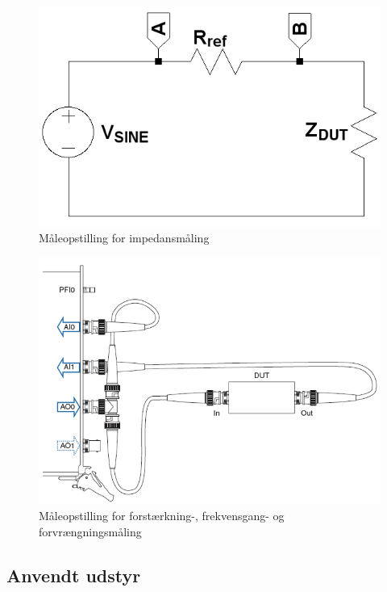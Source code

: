 \begin{figure}[h]
\centering
\includegraphics[scale=0.25]{maalerapporter/forforstaerker/impedansopstilling-forforstaerker.png}
\caption{Måleopstilling for impedansmåling}
\label{fig:maaleop-imp}
\end{figure}

\begin{figure}[h]
\centering
\includegraphics[scale=0.3]{maalerapporter/forforstaerker/maaleopstilling-thd-forforstaerker.png}
\caption{Måleopstilling for forstærkning-, frekvensgang- og forvrængningsmåling}
\label{fig:maaleop-thd}
\end{figure}

\subsection*{Anvendt udstyr}

